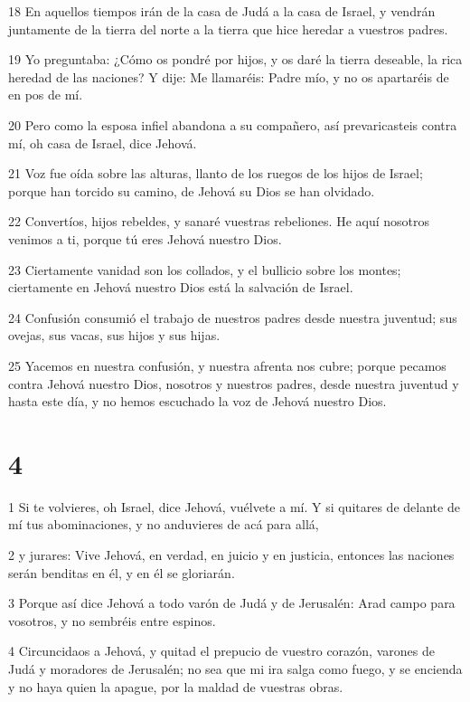 \par 18 En aquellos tiempos irán de la casa de Judá a la casa de Israel, y vendrán juntamente de la tierra del norte a la tierra que hice heredar a vuestros padres.
\par 19 Yo preguntaba: ¿Cómo os pondré por hijos, y os daré la tierra deseable, la rica heredad de las naciones? Y dije: Me llamaréis: Padre mío, y no os apartaréis de en pos de mí.
\par 20 Pero como la esposa infiel abandona a su compañero, así prevaricasteis contra mí, oh casa de Israel, dice Jehová.
\par 21 Voz fue oída sobre las alturas, llanto de los ruegos de los hijos de Israel; porque han torcido su camino, de Jehová su Dios se han olvidado.
\par 22 Convertíos, hijos rebeldes, y sanaré vuestras rebeliones. He aquí nosotros venimos a ti, porque tú eres Jehová nuestro Dios.
\par 23 Ciertamente vanidad son los collados, y el bullicio sobre los montes; ciertamente en Jehová nuestro Dios está la salvación de Israel.
\par 24 Confusión consumió el trabajo de nuestros padres desde nuestra juventud; sus ovejas, sus vacas, sus hijos y sus hijas.
\par 25 Yacemos en nuestra confusión, y nuestra afrenta nos cubre; porque pecamos contra Jehová nuestro Dios, nosotros y nuestros padres, desde nuestra juventud y hasta este día, y no hemos escuchado la voz de Jehová nuestro Dios.

\chapter{4}

\par 1 Si te volvieres, oh Israel, dice Jehová, vuélvete a mí. Y si quitares de delante de mí tus abominaciones, y no anduvieres de acá para allá,
\par 2 y jurares: Vive Jehová, en verdad, en juicio y en justicia, entonces las naciones serán benditas en él, y en él se gloriarán.
\par 3 Porque así dice Jehová a todo varón de Judá y de Jerusalén: Arad campo para vosotros, y no sembréis entre espinos. 
\par 4 Circuncidaos a Jehová, y quitad el prepucio de vuestro corazón, varones de Judá y moradores de Jerusalén; no sea que mi ira salga como fuego, y se encienda y no haya quien la apague, por la maldad de vuestras obras.

